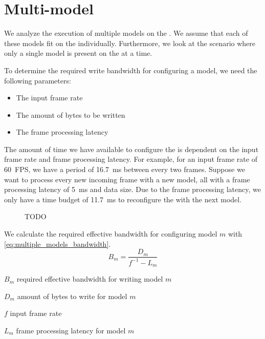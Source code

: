 \section{Multi-model}
We analyze the execution of multiple models on the \graicore{}.
We assume that each of these models fit on the \graicore{} individually.
Furthermore, we look at the scenario where only a single model is present on the \graicore{} at a time.


To determine the required write bandwidth for configuring a model, we need the following parameters:
\begin{itemize}
    \item The input frame rate
    \item The amount of bytes to be written
    \item The frame processing latency
\end{itemize}

The amount of time we have available to configure the \graicore{} is dependent on the input frame rate and frame processing latency.
For example, for an input frame rate of \SI{60}{FPS}, we have a period of \SI{16.7}{ms} between every two frames.
Suppose we want to process every new incoming frame with a new model, all with a frame processing latency of \SI{5}{ms} and data size. 
Due to the frame processing latency, we only have a time budget of \SI{11.7}{ms} to reconfigure the \graicore{} with the next model.

\begin{figure}[htbp]
    \centering
    
    \caption{TODO}
    \label{fig:reconfig_time_line_ex3}
\end{figure}

We calculate the required effective bandwidth for configuring model $m$ with \cref{eq:multiple_models_bandwidth}.
\begin{equation}
    B_m = \frac{D_m}{f^{-1} - L_m}
    \label{eq:multiple_models_bandwidth}
\end{equation}

\begin{eqexpl}[15mm]
    \item{$B_m$} required effective bandwidth for writing model $m$
    \item{$D_m$} amount of bytes to write for model $m$
    \item{$f$} input frame rate
    \item{$L_m$} frame processing latency for model $m$
\end{eqexpl}

